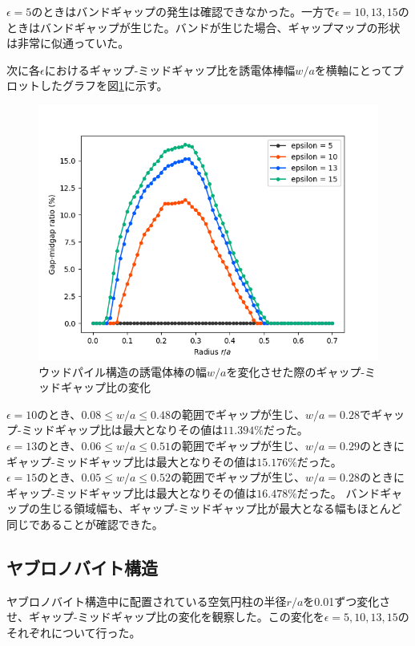 \documentclass[platex,dvipdfmx]{jsreport}
\numberwithin{equation}{section}
\begin{document}
$\epsilon = 5$のときはバンドギャップの発生は確認できなかった。一方で$\epsilon = 10, 13, 15$のときはバンドギャップが生じた。バンドが生じた場合、ギャップマップの形状は非常に似通っていた。

次に各$\epsilon$におけるギャップ-ミッドギャップ比を誘電体棒幅$w / a$を横軸にとってプロットしたグラフを図\ref{fig:woodpile}に示す。 



\begin{figure}[htbp]
  \centering
  \includegraphics[width=0.8\linewidth]{results/gap_midgap_ratio/woodpile-2.png}
  \caption{ウッドパイル構造の誘電体棒の幅$w / a$を変化させた際のギャップ-ミッドギャップ比の変化}
  \label{fig:woodpile}
\end{figure}

$\epsilon = 10$のとき、$0.08 \leq w / a \leq 0.48$の範囲でギャップが生じ、$ w / a = 0.28$でギャップ-ミッドギャップ比は最大となりその値は$11.394 \%$だった。\\
$\epsilon = 13$のとき、$0.06 \leq w / a \leq 0.51$の範囲でギャップが生じ、$w / a = 0.29$のときにギャップ-ミッドギャップ比は最大となりその値は$15.176 \%$だった。\\
$\epsilon = 15$のとき、$0.05 \leq w / a \leq 0.52$の範囲でギャップが生じ、$w / a = 0.28$のときにギャップ-ミッドギャップ比は最大となりその値は$16.478 \%$だった。
バンドギャップの生じる領域幅も、ギャップ-ミッドギャップ比が最大となる幅もほとんど同じであることが確認できた。

\clearpage
\subsection{ヤブロノバイト構造}
ヤブロノバイト構造中に配置されている空気円柱の半径$r / a$を0.01ずつ変化させ、ギャップ-ミッドギャップ比の変化を観察した。この変化を$\epsilon = 5, 10, 13, 15$のそれぞれについて行った。
\end{document}
